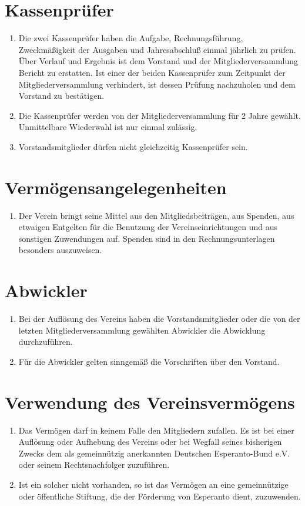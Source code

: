 \documentclass[11pt]{article}
\begin{document}
\section{Kassenprüfer}
\begin{enumerate}[label=\arabic*)]
	\item Die zwei Kassenprüfer haben die Aufgabe, Rechnungsführung, Zweckmäßigkeit der Ausgaben und Jahresabschluß einmal jährlich zu prüfen. Über Verlauf und Ergebnis ist dem Vorstand und der Mitgliederversammlung Bericht zu erstatten. Ist einer der beiden Kassenprüfer zum Zeitpunkt der Mitgliederversammlung verhindert, ist dessen Prüfung nachzuholen und dem Vorstand zu bestätigen.
	\item Die Kassenprüfer werden von der Mitgliederversammlung für 2 Jahre gewählt. Unmittelbare Wiederwahl ist nur einmal zulässig.
	\item Vorstandsmitglieder dürfen nicht gleichzeitig Kassenprüfer sein.
\end{enumerate}

\section{Vermögensangelegenheiten}
\begin{enumerate}[label=\arabic*)]
	\item Der Verein bringt seine Mittel aus den Mitgliedsbeiträgen, aus Spenden, aus etwaigen Entgelten für die Benutzung der Vereinseinrichtungen und aus sonstigen Zuwendungen auf. Spenden sind in den Rechnungsunterlagen besonders auszuweisen.
\end{enumerate}

\section{Abwickler}
\begin{enumerate}[label=\arabic*)]
	\item Bei der Auflösung des Vereins haben die Vorstandsmitglieder oder die von der letzten Mitgliederversammlung gewählten Abwickler die Abwicklung durchzuführen.
	\item Für die Abwickler gelten sinngemäß die Vorschriften über den Vorstand.
\end{enumerate}

\section{Verwendung des Vereinsvermögens}
\begin{enumerate}[label=\arabic*)]
	\item Das Vermögen darf in keinem Falle den Mitgliedern zufallen. Es ist bei einer Auflösung oder Aufhebung des Vereins oder bei Wegfall seines bisherigen Zwecks dem als gemeinnützig anerkannten Deutschen Esperanto-Bund e.V. oder seinem Rechtsnachfolger zuzuführen.
	\item Ist ein solcher nicht vorhanden, so ist das Vermögen an eine gemeinnützige oder öffentliche Stiftung, die der Förderung von Esperanto dient, zuzuwenden.
\end{enumerate}
\end{document}
